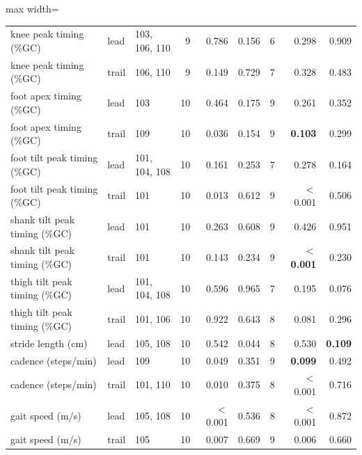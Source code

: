 \begin{adjustbox}{max width=\textwidth}
{\begin{tabular}{llp{2.6cm}rrrrrr}
knee peak timing (\%GC) & lead & 103, 106, 110 & 9 & 0.786 & 0.156 & 6 & 0.298 & 0.909 \\
knee peak timing (\%GC) & trail & 106, 110 & 9 & 0.149 & 0.729 & 7 & 0.328 & 0.483 \\
foot apex timing (\%GC) & lead & 103 & 10 & 0.464 & 0.175 & 9 & 0.261 & 0.352 \\
foot apex timing (\%GC) & trail & 109 & 10 & 0.036 & 0.154 & 9 & \textbf{0.103} & 0.299 \\
foot tilt peak timing (\%GC) & lead & 101, 104, 108 & 10 & 0.161 & 0.253 & 7 & 0.278 & 0.164 \\
foot tilt peak timing (\%GC) & trail & 101 & 10 & 0.013 & 0.612 & 9 & $<$0.001 & 0.506 \\
shank tilt peak timing (\%GC) & lead & 101 & 10 & 0.263 & 0.608 & 9 & 0.426 & 0.951 \\
shank tilt peak timing (\%GC) & trail & 101 & 10 & 0.143 & 0.234 & 9 & \textbf{$<$0.001} & 0.230 \\
thigh tilt peak timing (\%GC) & lead & 101, 104, 108 & 10 & 0.596 & 0.965 & 7 & 0.195 & 0.076 \\
thigh tilt peak timing (\%GC) & trail & 101, 106 & 10 & 0.922 & 0.643 & 8 & 0.081 & 0.296 \\
stride length (cm) & lead & 105, 108 & 10 & 0.542 & 0.044 & 8 & 0.530 & \textbf{0.109} \\
cadence (steps/min) & lead & 109 & 10 & 0.049 & 0.351 & 9 & \textbf{0.099} & 0.492 \\
cadence (steps/min) & trail & 101, 110 & 10 & 0.010 & 0.375 & 8 & $<$0.001 & 0.716 \\
gait speed (m/s) & lead & 105, 108 & 10 & $<$0.001 & 0.536 & 8 & $<$0.001 & 0.872 \\
gait speed (m/s) & trail & 105 & 10 & 0.007 & 0.669 & 9 & 0.006 & 0.660 \\
\bottomrule
\end{tabular}
}
\end{adjustbox}
